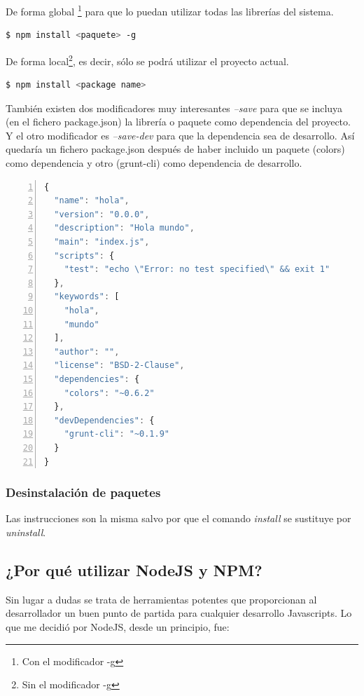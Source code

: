De forma global \footnote{Con el modificador -g} para que lo puedan utilizar todas las librerías del sistema.

\begin{lstlisting}[language=bash, numbers=none]
$ npm install <paquete> -g
\end{lstlisting}

De forma local\footnote{Sin el modificador -g}, es decir, sólo se podrá utilizar el proyecto actual.

\begin{lstlisting}[language=bash, numbers=none]
$ npm install <package name>
\end{lstlisting}

También existen dos modificadores muy interesantes \textit{--save} para que se incluya (en el fichero package.json) la librería o paquete como dependencia del proyecto. Y el otro modificador es \textit{--save-dev} para que la dependencia sea de desarrollo. Así quedaría un fichero package.json después de haber incluido un paquete (colors) como dependencia y otro (grunt-cli) como dependencia de desarrollo.

\begin{lstlisting}[language=JavaScript, numbers=left]
{
  "name": "hola",
  "version": "0.0.0",
  "description": "Hola mundo",
  "main": "index.js",
  "scripts": {
    "test": "echo \"Error: no test specified\" && exit 1"
  },
  "keywords": [
    "hola",
    "mundo"
  ],
  "author": "",
  "license": "BSD-2-Clause",
  "dependencies": {
    "colors": "~0.6.2"
  },
  "devDependencies": {
    "grunt-cli": "~0.1.9"
  }
}
\end{lstlisting}

\subsubsection{Desinstalación de paquetes}

Las instrucciones son la misma salvo por que el comando \textit{install} se sustituye por \textit{uninstall}.

\subsection{¿Por qué utilizar NodeJS y NPM?}
Sin lugar a dudas se trata de herramientas potentes que proporcionan al desarrollador un buen punto de partida para cualquier desarrollo Javascripts. Lo que me decidió por NodeJS, desde un principio, fue:

